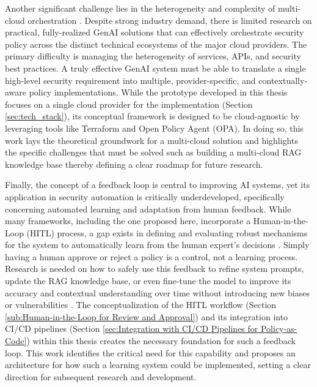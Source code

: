 Another significant challenge lies in the heterogeneity and complexity of multi-cloud orchestration \cite{seth_ai_2025-1,bringhenti_security_2023-1}. Despite strong industry demand, there is limited research on practical, fully-realized GenAI solutions that can effectively orchestrate security policy across the distinct technical ecosystems of the major cloud providers. The primary difficulty is managing the heterogeneity of services, APIs, and security best practices. A truly effective GenAI system must be able to translate a single high-level security requirement into multiple, provider-specific, and contextually-aware policy implementations. While the prototype developed in this thesis focuses on a single cloud provider for the implementation (Section \ref{sec:tech_stack}), its conceptual framework is designed to be cloud-agnostic by leveraging tools like Terraform and Open Policy Agent (OPA). In doing so, this work lays the theoretical groundwork for a multi-cloud solution and highlights the specific challenges that must be solved such as building a multi-cloud RAG knowledge base thereby defining a clear roadmap for future research.

Finally, the concept of a feedback loop is central to improving AI systems, yet its application in security automation is critically underdeveloped, specifically concerning automated learning and adaptation from human feedback. While many frameworks, including the one proposed here, incorporate a Human-in-the-Loop (HITL) process, a gap exists in defining and evaluating robust mechanisms for the system to automatically learn from the human expert’s decisions \cite{nicosia_6_2024,noauthor_human---loop_nodate}. Simply having a human approve or reject a policy is a control, not a learning process. Research is needed on how to safely use this feedback to refine system prompts, update the RAG knowledge base, or even fine-tune the model to improve its accuracy and contextual understanding over time without introducing new biases or vulnerabilities \cite{tabassi_artificial_2023-1,surathunmanun_exploring_2024-1}. The conceptualization of the HITL workflow (Section \ref{sub:Human-in-the-Loop for Review and Approval}) and its integration into CI/CD pipelines (Section \ref{sec:Integration with CI/CD Pipelines for Policy-as-Code}) within this thesis creates the necessary foundation for such a feedback loop. This work identifies the critical need for this capability and proposes an architecture for how such a learning system could be implemented, setting a clear direction for subsequent research and development.



